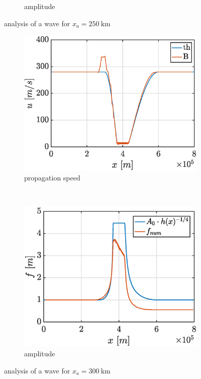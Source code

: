 \documentclass[a4paper,12pt,twoside]{article}
\begin{document}
\begin{figure}[h]
\begin{subfigure}[t]{0.45\textwidth}
          \caption{amplitude}
          \label{fig:xa250000_f}
        \end{subfigure}
        \caption{analysis of a wave for $x_a = \SI{250}{\kilo\meter}$}
        \label{fig:xa250000}
      \end{figure}

      \begin{figure}[h]
        \centering
        \begin{subfigure}[t]{0.45\textwidth}
          \includegraphics[width=\textwidth]{graphs/xa300000_tfin15000_u.eps}
          \caption{propagation speed}
          \label{fig:xa300000_u}
        \end{subfigure}
        ~
        \begin{subfigure}[t]{0.45\textwidth}
          \includegraphics[width=\textwidth]{graphs/xa300000_tfin15000_f.eps}
          \caption{amplitude}
          \label{fig:xa300000_f}
        \end{subfigure}
        \caption{analysis of a wave for $x_a = \SI{300}{\kilo\meter}$}
        \label{fig:xa300000}
      \end{figure}
\end{document}
